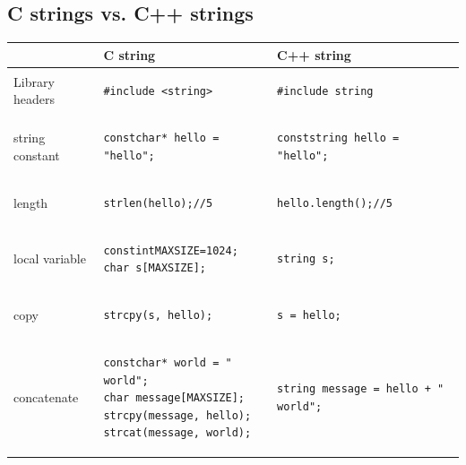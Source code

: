 \subsection{C strings vs. C++ strings}
\begin{center}
\begin{tabular}[breaklines=true]{p{5cm}|p{5cm}|p{5cm}}
	& C string & C++ string \\
	\hline
	Library headers & 
{\begin{lstlisting}[style=C++] 
#include <string>
\end{lstlisting}} & 
{\begin{lstlisting}[style=C++]
#include string
\end{lstlisting}}\\	
	string constant &
{\begin{lstlisting}[style=C++]
constchar* hello = "hello";
\end{lstlisting}}&
{\begin{lstlisting}[style=C++]
conststring hello = "hello";
\end{lstlisting}} \\
	length &
{\begin{lstlisting}[style=C++]
strlen(hello);//5
\end{lstlisting}} &
{\begin{lstlisting}[style=C++]
hello.length();//5
\end{lstlisting}} \\
	local variable &
{\begin{lstlisting}[style=C++]
constintMAXSIZE=1024; 
char s[MAXSIZE];
\end{lstlisting}} &
{\begin{lstlisting}[style=C++]
string s;
\end{lstlisting}} \\
	copy &
{\begin{lstlisting}[style=C++]
strcpy(s, hello);
\end{lstlisting}} &
{\begin{lstlisting}[style=C++]
s = hello;
\end{lstlisting}} \\
	concatenate &
{\begin{lstlisting}[style=C++]
constchar* world = " world";
char message[MAXSIZE];
strcpy(message, hello);
strcat(message, world);
\end{lstlisting}} &
{\begin{lstlisting}[style=C++]
string message = hello + " world";
\end{lstlisting}} \\

\end{tabular}
\end{center}
